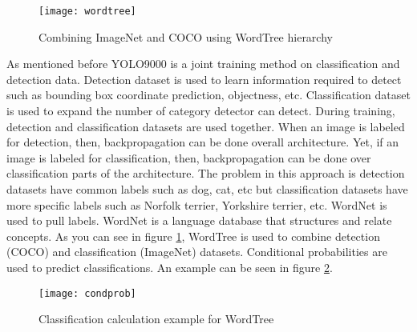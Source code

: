 \documentclass{article}
\begin{document}
\begin{enumerate}
    \begin{figure}
        \centering
        \texttt{[image: wordtree]}
        \caption{Combining ImageNet and COCO using WordTree hierarchy}
        \label{fig:wordtree1}
    \end{figure}
    
    As mentioned before YOLO9000 is a joint training method on classification and detection 
    data. Detection dataset is used to learn information required to detect such as bounding 
    box coordinate prediction, objectness, etc. Classification dataset is used to expand the 
    number of category detector can detect. During training, detection and classification 
    datasets are used together. When an image is labeled for detection, then, backpropagation 
    can be done overall architecture. Yet, if an image is labeled for classification, then, 
    backpropagation can be done over classification parts of the architecture. The problem in this 
    approach is detection datasets have common labels such as dog, cat, etc but classification 
    datasets have more specific labels such as Norfolk terrier, Yorkshire terrier, etc. 
    WordNet is used to pull labels. WordNet is a language database that structures and relate 
    concepts. As you can see in figure \ref{fig:wordtree1}, WordTree is used to combine 
    detection (COCO) and classification (ImageNet) datasets. Conditional probabilities are used 
    to predict classifications. An example can be seen in figure \ref{fig:condprob1}.
    
    \begin{figure}
        \centering
        \texttt{[image: condprob]}
        \caption{Classification calculation example for WordTree}
        \label{fig:condprob1}
    \end{figure}
\end{enumerate}
\end{document}
